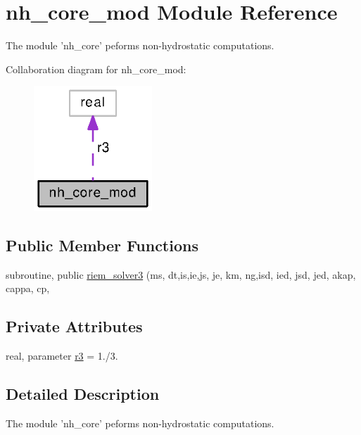 \section{nh\-\_\-core\-\_\-mod Module Reference}
\label{classnh__core__mod}


The module 'nh\-\_\-core' peforms non-\/hydrostatic computations.  




Collaboration diagram for nh\-\_\-core\-\_\-mod\-:
\nopagebreak
\begin{figure}[H]
\begin{center}
\leavevmode
\includegraphics[width=126pt]{classnh__core__mod__coll__graph}
\end{center}
\end{figure}
\subsection*{Public Member Functions}
\begin{DoxyCompactItemize}
\item 
subroutine, public \hyperlink{classnh__core__mod_af39c4d38790cffa5207d7e937d320d7d}{riem\-\_\-solver3} (ms, dt,is,ie,js, je, km, ng,isd, ied, jsd, jed, akap, cappa, cp,
\end{DoxyCompactItemize}
\subsection*{Private Attributes}
\begin{DoxyCompactItemize}
\item 
real, parameter \hyperlink{classnh__core__mod_ae83e5bc4677454ff2be94ad7952e85bd}{r3} = 1./3.
\end{DoxyCompactItemize}


\subsection{Detailed Description}
The module 'nh\-\_\-core' peforms non-\/hydrostatic computations. 

